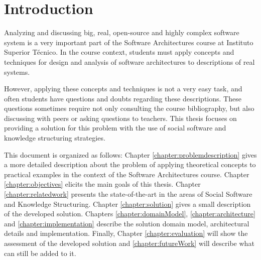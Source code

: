 
\chapter{Introduction}
\label{chapter:introduction}

Analyzing and discussing big, real, open-source and highly complex software system is a very important part of the Software Architectures course at Instituto Superior T\'{e}cnico. In the course context, students must apply concepts and techniques for design and analysis of software architectures to descriptions of real systems. 

However, applying these concepts and techniques is not a very easy task, and often students have questions and doubts regarding these descriptions. These questions sometimes require not only consulting the course bibliography, but also discussing with peers or asking questions to teachers. This thesis focuses on providing a solution for this problem with the use of social software and knowledge structuring strategies.

This document is organized as follows: Chapter \ref{chapter:problemdescription} gives a more detailed description about the problem of applying theoretical concepts to practical examples in the context of the Software Architectures course. Chapter \ref{chapter:objectives} elicits the main goals of this thesis. Chapter \ref{chapter:relatedwork} presents the state-of-the-art in the areas of Social Software and Knowledge Structuring. Chapter \ref{chapter:solution} gives a small description of the developed solution. Chapters \ref{chapter:domainModel}, \ref{chapter:architecture} and \ref{chapter:implementation} describe the solution domain model, architectural details and implementation. Finally, Chapter \ref{chapter:evaluation} will show the assessment of the developed solution and \ref{chapter:futureWork} will describe what can still be added to it.